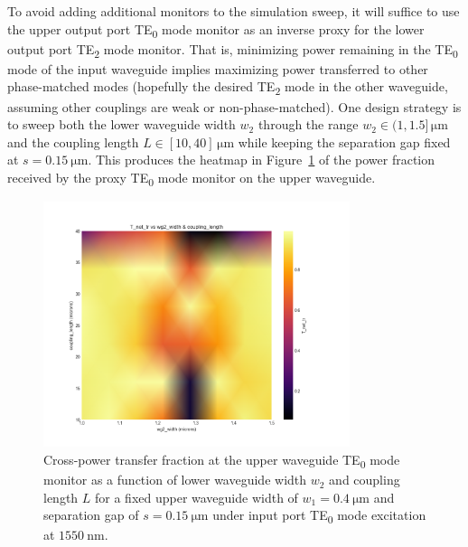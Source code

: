 \documentclass[10pt, a4paper]{article}
\begin{document}
To avoid adding additional monitors to the simulation sweep,
it will suffice to use the upper output port TE\textsubscript{0} mode monitor as an inverse proxy for the lower output port TE\textsubscript{2} mode monitor. That is, minimizing power remaining in the TE\textsubscript{0} mode of the input waveguide implies maximizing power transferred to other phase-matched modes (hopefully the desired TE\textsubscript{2} mode in the other waveguide, assuming other couplings are weak or non-phase-matched).
One design strategy is to sweep both the lower waveguide width \(w_2\) through the range \(w_2\in(1,1.5]\,\unit{\um}\) and the coupling length \(L\in[10,40]\,\unit{\um}\) while keeping the separation gap fixed at \(s=\SI{0.15}{\um}\).
This produces the heatmap in Figure~\ref{fig:te0_te2_coupling_heatmap} of the power fraction received by the proxy TE\textsubscript{0} mode monitor on the upper waveguide.
\begin{figure}[h!]
  \centering
  \includegraphics[width=0.8\textwidth]{task3/sweep_plots/sweep_idx_7_sweep__coupling_length=10_40_6_wg1_width=0.4_wg2_width=1_1.5_8_separation=0.15_center_wavelength=1.55_T_net_tr_heatmap.png}
  \caption{Cross-power transfer fraction at the upper waveguide TE\textsubscript{0} mode monitor as a function of lower waveguide width \(w_2\) and coupling length \(L\) for a fixed upper waveguide width of \(w_1=\SI{0.4}{\um}\) and separation gap of \(s=\SI{0.15}{\um}\) under input port TE\textsubscript{0} mode excitation at \(\SI{1550}{\nm}\).}
  \label{fig:te0_te2_coupling_heatmap}
\end{figure}
\end{document}
